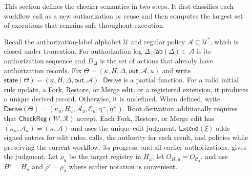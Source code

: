 This section defines the checker semantics in two steps.
It first classifies each workflow call as a new authorization or reuse and then computes the largest set of executions that remains safe throughout execution.

Recall the authorization-label alphabet \(\mathcal U\) and regular policy \(\mathcal A\subseteq\mathcal U^*\), which is closed under truncation.
For authorization log \(\Delta\), \(\mathsf{lab}(\Delta)\in\mathcal A\) is its authorization sequence and \(D_\Delta\) is the set of actions that already have authorization records.
Fix \(\Theta=(\kappa,H,\Delta,\mathsf{out},\mathcal A,u)\) and write \(\mathsf{state}(\Theta)=(\kappa,H,\Delta,\mathsf{out},\mathcal A)\).
\(\mathsf{Derive}\) is a partial function.
For a valid initial rule update, a Fork, Restore, or Merge edit, or a registered extension, it produces a unique derived record.
Otherwise, it is undefined.
When defined, write \(\mathsf{Derive}(\Theta)=(\kappa_u,H_u,\mathcal A_u,\mathcal C_u,\eta^-,\eta^+)\).
Root derivation additionally requires that \(\mathsf{CheckReg}(\mathcal W,\mathcal R)\) accept.
Each Fork, Restore, or Merge edit has \((\kappa_u,\mathcal A_u)=(\kappa,\mathcal A)\) and uses the unique edit judgment.
\(\mathsf{Extend}(\xi)\) adds signed entries for edit rules, calls, the authority for each result, and policies while preserving the current workflow, its progress, and all earlier authorizations.
 gives the judgment.
Let \(\rho_u\) be the target registry in \(H_u\), let \(O_{H,u}=O_{\mathcal C_u}\), and use \(H'=H_u\) and \(\rho'=\rho_u\) where earlier notation is convenient.
